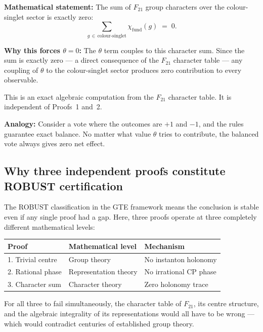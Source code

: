 \documentclass[11pt,a4paper]{article}
\begin{document}
\begin{tcolorbox}[colback=boxblue,colframe=blue!40!black,title=Proof 3: Character Sum Vanishes]
\textbf{Mathematical statement:}  The sum of $F_{21}$ group characters over the colour-singlet sector is exactly zero:
\[
  \sum_{g\,\in\,\text{colour-singlet}} \chi_{\mathrm{fund}}(g) \;=\; 0.
\]

\textbf{Why this forces $\theta = 0$:}  The $\theta$ term couples to this character sum.  Since the sum is exactly zero --- a direct consequence of the $F_{21}$ character table --- any coupling of $\theta$ to the colour-singlet sector produces zero contribution to every observable.

This is an exact algebraic computation from the $F_{21}$ character table.  It is independent of Proofs~1 and~2.
\end{tcolorbox}

\medskip\noindent\textbf{Analogy:}  Consider a vote where the outcomes are $+1$ and $-1$, and the rules guarantee exact balance.  No matter what value $\theta$ tries to contribute, the balanced vote always gives zero net effect.

\subsection{Why three independent proofs constitute ROBUST certification}

The ROBUST classification in the GTE framework means the conclusion is stable even if any single proof had a gap.  Here, three proofs operate at three completely different mathematical levels:

\begin{center}
\begin{tabular}{lll}
\toprule
Proof & Mathematical level & Mechanism \\
\midrule
1. Trivial centre & Group theory & No instanton holonomy \\
2. Rational phase & Representation theory & No irrational CP phase \\
3. Character sum & Character theory & Zero holonomy trace \\
\bottomrule
\end{tabular}
\end{center}

\medskip
For all three to fail simultaneously, the character table of $F_{21}$, its centre structure, and the algebraic integrality of its representations would all have to be wrong --- which would contradict centuries of established group theory.
\end{document}
